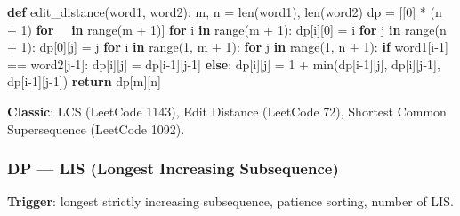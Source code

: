 \documentclass[11pt]{article}
\newenvironment{Shaded}{\begin{snugshade}}{\end{snugshade}}
\newcommand{\BuiltInTok}[1]{\textcolor[rgb]{0.50,0.55,0.55}{#1}}
\newcommand{\ControlFlowTok}[1]{\textcolor[rgb]{0.99,0.74,0.29}{\textbf{#1}}}
\newcommand{\DecValTok}[1]{\textcolor[rgb]{0.96,0.45,0.00}{#1}}
\newcommand{\KeywordTok}[1]{\textcolor[rgb]{0.81,0.81,0.76}{\textbf{#1}}}
\newcommand{\NormalTok}[1]{\textcolor[rgb]{0.81,0.81,0.76}{#1}}
\newcommand{\OperatorTok}[1]{\textcolor[rgb]{0.81,0.81,0.76}{#1}}
\begin{document}
\begin{Shaded}
\begin{Highlighting}[]
\KeywordTok{def}\NormalTok{ edit\_distance(word1, word2):}
\NormalTok{    m, n }\OperatorTok{=} \BuiltInTok{len}\NormalTok{(word1), }\BuiltInTok{len}\NormalTok{(word2)}
\NormalTok{    dp }\OperatorTok{=}\NormalTok{ [[}\DecValTok{0}\NormalTok{] }\OperatorTok{*}\NormalTok{ (n }\OperatorTok{+} \DecValTok{1}\NormalTok{) }\ControlFlowTok{for}\NormalTok{ \_ }\KeywordTok{in} \BuiltInTok{range}\NormalTok{(m }\OperatorTok{+} \DecValTok{1}\NormalTok{)]}
    \ControlFlowTok{for}\NormalTok{ i }\KeywordTok{in} \BuiltInTok{range}\NormalTok{(m }\OperatorTok{+} \DecValTok{1}\NormalTok{): dp[i][}\DecValTok{0}\NormalTok{] }\OperatorTok{=}\NormalTok{ i}
    \ControlFlowTok{for}\NormalTok{ j }\KeywordTok{in} \BuiltInTok{range}\NormalTok{(n }\OperatorTok{+} \DecValTok{1}\NormalTok{): dp[}\DecValTok{0}\NormalTok{][j] }\OperatorTok{=}\NormalTok{ j}
    \ControlFlowTok{for}\NormalTok{ i }\KeywordTok{in} \BuiltInTok{range}\NormalTok{(}\DecValTok{1}\NormalTok{, m }\OperatorTok{+} \DecValTok{1}\NormalTok{):}
        \ControlFlowTok{for}\NormalTok{ j }\KeywordTok{in} \BuiltInTok{range}\NormalTok{(}\DecValTok{1}\NormalTok{, n }\OperatorTok{+} \DecValTok{1}\NormalTok{):}
            \ControlFlowTok{if}\NormalTok{ word1[i}\OperatorTok{{-}}\DecValTok{1}\NormalTok{] }\OperatorTok{==}\NormalTok{ word2[j}\OperatorTok{{-}}\DecValTok{1}\NormalTok{]:}
\NormalTok{                dp[i][j] }\OperatorTok{=}\NormalTok{ dp[i}\OperatorTok{{-}}\DecValTok{1}\NormalTok{][j}\OperatorTok{{-}}\DecValTok{1}\NormalTok{]}
            \ControlFlowTok{else}\NormalTok{:}
\NormalTok{                dp[i][j] }\OperatorTok{=} \DecValTok{1} \OperatorTok{+} \BuiltInTok{min}\NormalTok{(dp[i}\OperatorTok{{-}}\DecValTok{1}\NormalTok{][j], dp[i][j}\OperatorTok{{-}}\DecValTok{1}\NormalTok{], dp[i}\OperatorTok{{-}}\DecValTok{1}\NormalTok{][j}\OperatorTok{{-}}\DecValTok{1}\NormalTok{])}
    \ControlFlowTok{return}\NormalTok{ dp[m][n]}
\end{Highlighting}
\end{Shaded}

\textbf{Classic}: LCS (LeetCode 1143), Edit Distance (LeetCode 72), Shortest Common Supersequence (LeetCode 1092).

\subsubsection{DP --- LIS (Longest Increasing Subsequence)}\label{dp--lis-longest-increasing-subsequence}

\textbf{Trigger}: longest strictly increasing subsequence, patience sorting, number of LIS.
\end{document}
